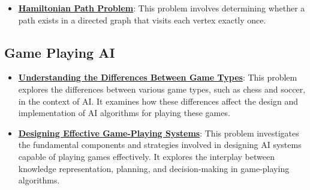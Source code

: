 \documentclass{article}%
\begin{document}
\begin{itemize}[leftmargin=*]
\item \href{https://purdue.brightspace.com/d2l/common/assets/pdfjs-d2l-dist/1.0.14-legacy/web/viewer.html?file=\%2Fcontent\%2Fenforced\%2F1095467-wl.202510.CS.24300.001\%2F15L2-SAT.pdf\%3Fou\%3D1095467\&lang=en-us\&container=d2l-fileviewer-rendered-pdf\&fullscreen=d2l-fileviewer-rendered-pdf-dialog\&height=667#page=40}{\textbf{Hamiltonian Path Problem}}: This problem involves determining whether a path exists in a directed graph that visits each vertex exactly once.%
\end{itemize}

%
\subsection{Game Playing AI}%
\label{subsec:GamePlayingAI}%
\begin{itemize}[leftmargin=*]%
\item \href{https://purdue.brightspace.com/d2l/common/assets/pdfjs-d2l-dist/1.0.14-legacy/web/viewer.html?file=\%2Fcontent\%2Fenforced\%2F1095467-wl.202510.CS.24300.001\%2F02L2-Intro.pdf\%3Fou\%3D1095467\&lang=en-us\&container=d2l-fileviewer-rendered-pdf\&fullscreen=d2l-fileviewer-rendered-pdf-dialog\&height=667#page=27}{\textbf{Understanding the Differences Between Game Types}}: This problem explores the differences between various game types, such as chess and soccer, in the context of AI. It examines how these differences affect the design and implementation of AI algorithms for playing these games.%
\item \href{https://purdue.brightspace.com/d2l/common/assets/pdfjs-d2l-dist/1.0.14-legacy/web/viewer.html?file=\%2Fcontent\%2Fenforced\%2F1095467-wl.202510.CS.24300.001\%2F02L2-Intro.pdf\%3Fou\%3D1095467\&lang=en-us\&container=d2l-fileviewer-rendered-pdf\&fullscreen=d2l-fileviewer-rendered-pdf-dialog\&height=667#page=47}{\textbf{Designing Effective Game-Playing Systems}}: This problem investigates the fundamental components and strategies involved in designing AI systems capable of playing games effectively. It explores the interplay between knowledge representation, planning, and decision-making in game-playing algorithms.%
\end{itemize}

%
\end{document}

